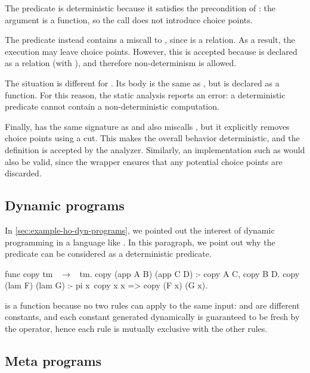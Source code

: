 The predicate  is deterministic because it satisfies the precondition
of : the argument  is a function, so the call does not
introduce choice points.

The predicate  instead contains a miscall to , since
 is a relation. As a result, the execution may leave choice
points. However, this is accepted because  is declared as a
relation (with ), and therefore non-determinism is allowed.

The situation is different for . Its body is the same as , but
 is declared as a function. For this reason, the static analysis
reports an error: a deterministic predicate cannot contain a
non-deterministic computation.

Finally,  has the same signature as  and also miscalls
, but it explicitly removes choice points using a cut. This makes
the overall behavior deterministic, and the definition is accepted by the
analyzer. Similarly, an implementation such as
 would also be valid, since the 
wrapper ensures that any potential choice points are discarded.



\subsection{Dynamic programs}
\label{sec:dynamic-prog}

In \cref{sec:example-ho-dyn-programs}, we pointed out the interest of dynamic
programming in a language like \elpi. In this paragraph, we point out why the
predicate  can be considered as a deterministic predicate.
%
\begin{elpicode}
func copy tm ~$\to$~ tm.
copy (app A B) (app C D) :- copy A C, copy B D.
copy (lam F)   (lam G)   :- pi x\ copy x x => copy (F x) (G x).
\end{elpicode}
%

 is a function because no
two rules can apply to the same input:  and 
are different constants, and each constant  generated dynamically is
guaranteed to be fresh by the  operator, hence
each  rule is mutually exclusive with the other rules.

\subsection{Meta programs}
\label{sec:meta-prog}

